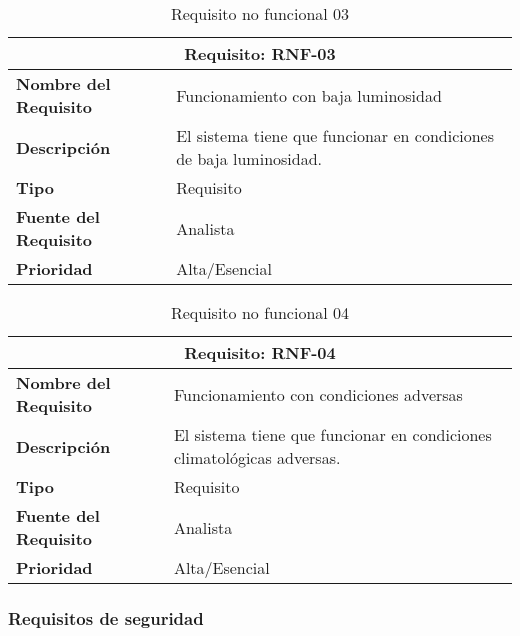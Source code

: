 \begin{table}[H]
\begin{center}
\begin{tabular}{p{} p{7cm}}
\multicolumn{2}{c}{\textbf{Requisito: RNF-03} } \\
\hline \hline
\textbf{Nombre del Requisito} & Funcionamiento con baja luminosidad\\
\hline
\textbf{Descripción} & El sistema tiene que funcionar en condiciones de baja luminosidad.\\
\hline
\textbf{Tipo} & Requisito  \\
\hline
\textbf{Fuente del Requisito} & Analista  \\
\hline
\textbf{Prioridad} & Alta/Esencial \\ \hline
\end{tabular}
\caption{Requisito no funcional 03}
\label{tab:RNF-03}
\end{center}
\end{table}

\begin{table}[H]
\begin{center}
\begin{tabular}{p{} p{7cm}}
\multicolumn{2}{c}{\textbf{Requisito: RNF-04} } \\
\hline \hline
\textbf{Nombre del Requisito} & Funcionamiento con condiciones adversas\\
\hline
\textbf{Descripción} & El sistema tiene que funcionar en condiciones climatológicas adversas.\\
\hline
\textbf{Tipo} & Requisito  \\
\hline
\textbf{Fuente del Requisito} & Analista  \\
\hline
\textbf{Prioridad} & Alta/Esencial \\ \hline
\end{tabular}
\caption{Requisito no funcional 04}
\label{tab:RNF-04}
\end{center}
\end{table}


\subsubsection{Requisitos de seguridad}

